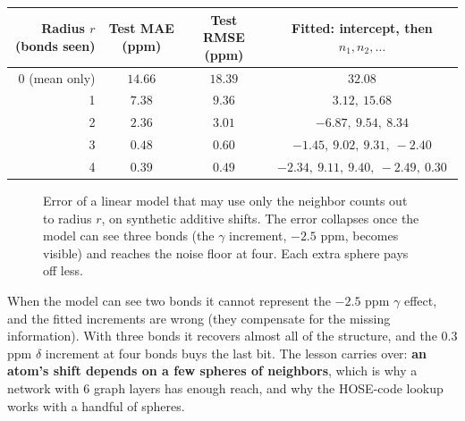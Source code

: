 \documentclass[11pt]{article}
\begin{document}
\begin{center}
\small
\begin{tabular}{@{}rccc@{}}
\toprule
Radius $r$ (bonds seen) & Test MAE (ppm) & Test RMSE (ppm) & Fitted: intercept, then $n_1,n_2,\dots$\\
\midrule
0 (mean only) & $14.66$ & $18.39$ & $32.08$\\
1 & $7.38$ & $9.36$ & $3.12,\ 15.68$\\
2 & $2.36$ & $3.01$ & $-6.87,\ 9.54,\ 8.34$\\
3 & $0.48$ & $0.60$ & $-1.45,\ 9.02,\ 9.31,\ -2.40$\\
4 & $0.39$ & $0.49$ & $-2.34,\ 9.11,\ 9.40,\ -2.49,\ 0.30$\\
\bottomrule
\end{tabular}
\end{center}

\begin{figure}[ht]
\centering
{}
\caption{Error of a linear model that may use only the neighbor counts out to radius $r$, on synthetic additive shifts. The error collapses once the model can see three bonds (the $\gamma$ increment, $-2.5$ ppm, becomes visible) and reaches the noise floor at four. Each extra sphere pays off less.}
\label{fig:radius}
\end{figure}

When the model can see two bonds it cannot represent the $-2.5$ ppm $\gamma$ effect, and the fitted increments are wrong (they compensate for the missing information). With three bonds it recovers almost all of the structure, and the $0.3$ ppm $\delta$ increment at four bonds buys the last bit. The lesson carries over: \textbf{an atom's shift depends on a few spheres of neighbors}, which is why a network with $6$ graph layers has enough reach, and why the HOSE-code lookup works with a handful of spheres.
\end{document}
